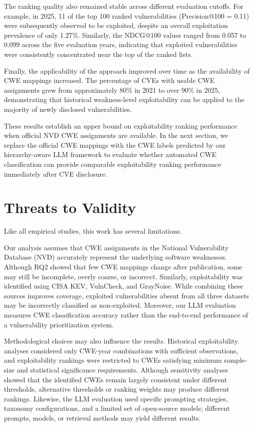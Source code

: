 \documentclass[conference,compsoc]{IEEEtran}
\begin{document}
The ranking quality also remained stable across different evaluation cutoffs. For example, in 2025, 11 of the top 100 ranked vulnerabilities (Precision@100 = 0.11) were subsequently observed to be exploited, despite an overall exploitation prevalence of only 1.27\%. Similarly, the NDCG@100 values ranged from 0.057 to 0.099 across the five evaluation years, indicating that exploited vulnerabilities were consistently concentrated near the top of the ranked lists.

Finally, the applicability of the approach improved over time as the availability of CWE mappings increased. The percentage of CVEs with usable CWE assignments grew from approximately 80\% in 2021 to over 90\% in 2025, demonstrating that historical weakness-level exploitability can be applied to the majority of newly disclosed vulnerabilities.

These results establish an upper bound on exploitability ranking performance when official NVD CWE assignments are available. In the next section, we replace the official CWE mappings with the CWE labels predicted by our hierarchy-aware LLM framework to evaluate whether automated CWE classification can provide comparable exploitability ranking performance immediately after CVE disclosure.

\section{Threats to Validity}

Like all empirical studies, this work has several limitations.

Our analysis assumes that CWE assignments in the National Vulnerability Database (NVD) accurately represent the underlying software weaknesses. Although RQ2 showed that few CWE mappings change after publication, some may still be incomplete, overly coarse, or incorrect. Similarly, exploitability was identified using CISA KEV, VulnCheck, and GrayNoise. While combining these sources improves coverage, exploited vulnerabilities absent from all three datasets may be incorrectly classified as non-exploited. Moreover, our LLM evaluation measures CWE classification accuracy rather than the end-to-end performance of a vulnerability prioritization system.

Methodological choices may also influence the results. Historical exploitability analyses considered only CWE-year combinations with sufficient observations, and exploitability rankings were restricted to CWEs satisfying minimum sample-size and statistical significance requirements. Although sensitivity analyses showed that the identified CWEs remain largely consistent under different thresholds, alternative thresholds or ranking weights may produce different rankings. Likewise, the LLM evaluation used specific prompting strategies, taxonomy configurations, and a limited set of open-source models; different prompts, models, or retrieval methods may yield different results.
\end{document}
